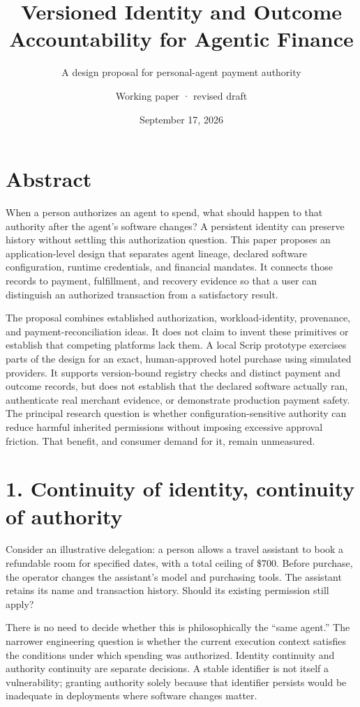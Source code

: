 \documentclass[
  11pt,
  letterpaper,
]{article}
\title{Versioned Identity and Outcome Accountability for Agentic
Finance}
\subtitle{A design proposal for personal-agent payment authority}
\author{Working paper · revised draft}
\date{September 17, 2026}
\begin{document}
\maketitle

\section{Abstract}\label{abstract}

When a person authorizes an agent to spend, what should happen to that
authority after the agent's software changes? A persistent identity can
preserve history without settling this authorization question. This
paper proposes an application-level design that separates agent lineage,
declared software configuration, runtime credentials, and financial
mandates. It connects those records to payment, fulfillment, and
recovery evidence so that a user can distinguish an authorized
transaction from a satisfactory result.

The proposal combines established authorization, workload-identity,
provenance, and payment-reconciliation ideas. It does not claim to
invent these primitives or establish that competing platforms lack them.
A local Scrip prototype exercises parts of the design for an exact,
human-approved hotel purchase using simulated providers. It supports
version-bound registry checks and distinct payment and outcome records,
but does not establish that the declared software actually ran,
authenticate real merchant evidence, or demonstrate production payment
safety. The principal research question is whether
configuration-sensitive authority can reduce harmful inherited
permissions without imposing excessive approval friction. That benefit,
and consumer demand for it, remain unmeasured.

\section{1. Continuity of identity, continuity of
authority}\label{continuity-of-identity-continuity-of-authority}

Consider an illustrative delegation: a person allows a travel assistant
to book a refundable room for specified dates, with a total ceiling of
\$700. Before purchase, the operator changes the assistant's model and
purchasing tools. The assistant retains its name and transaction
history. Should its existing permission still apply?

There is no need to decide whether this is philosophically the ``same
agent.'' The narrower engineering question is whether the current
execution context satisfies the conditions under which spending was
authorized. Identity continuity and authority continuity are separate
decisions. A stable identifier is not itself a vulnerability; granting
authority solely because that identifier persists would be inadequate in
deployments where software changes matter.
\end{document}
